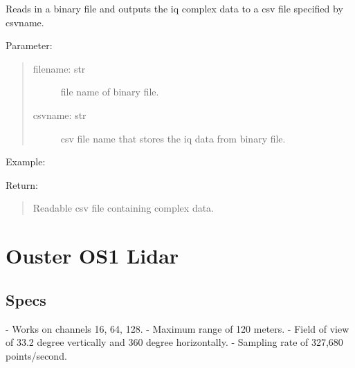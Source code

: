 \documentclass[letterpaper,10pt,english]{sphinxmanual}
\begin{document}
\begin{fulllineitems}
\label{\detokenize{TI radar:TI_parser.readTIdata}}
Reads in a binary file and outputs the iq complex data to a csv file specified by csvname.

Parameter:
\begin{quote}
\begin{description}
\item[{filename: str}] \leavevmode
file name of binary file.

\item[{csvname: str}] \leavevmode
csv file name that stores the iq data from binary file.

\end{description}
\end{quote}

Example:

\begin{sphinxVerbatim}[commandchars=\\\{\}]
\end{sphinxVerbatim}

Return:
\begin{quote}

Readable csv file containing complex data.
\end{quote}

\end{fulllineitems}



\section{Ouster OS1 Lidar}
\label{\detokenize{Ouster lidar:ouster-os1-lidar}}\label{\detokenize{Ouster lidar::doc}}

\subsection{Specs}
\label{\detokenize{Ouster lidar:specs}}
- Works on channels 16, 64, 128.
- Maximum range of 120 meters.
- Field of view of 33.2 degree vertically and 360 degree horizontally.
- Sampling rate of 327,680 points/second.
\end{document}
